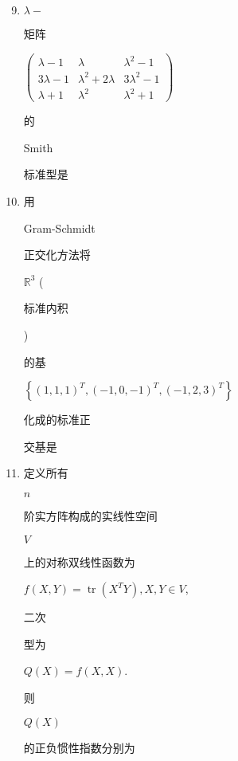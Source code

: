 \documentclass[10pt]{article}
\begin{document}
\begin{enumerate}
  \setcounter{enumi}{8}
  \item $\lambda-$ \begin{CJK}{UTF8}{mj}矩阵\end{CJK} $\left(\begin{array}{ccc}\lambda-1 & \lambda & \lambda^{2}-1 \\ 3 \lambda-1 & \lambda^{2}+2 \lambda & 3 \lambda^{2}-1 \\ \lambda+1 & \lambda^{2} & \lambda^{2}+1\end{array}\right)$ \begin{CJK}{UTF8}{mj}的\end{CJK} Smith \begin{CJK}{UTF8}{mj}标准型是\end{CJK}

  \item \begin{CJK}{UTF8}{mj}用\end{CJK} Gram-Schmidt \begin{CJK}{UTF8}{mj}正交化方法将\end{CJK} $\mathbb{R}^{3}$ (\begin{CJK}{UTF8}{mj}标准内积\end{CJK}) \begin{CJK}{UTF8}{mj}的基\end{CJK} $\left\{(1,1,1)^{T},(-1,0,-1)^{T},(-1,2,3)^{T}\right\}$ \begin{CJK}{UTF8}{mj}化成的标准正\end{CJK} \begin{CJK}{UTF8}{mj}交基是\end{CJK}

  \item \begin{CJK}{UTF8}{mj}定义所有\end{CJK} $n$ \begin{CJK}{UTF8}{mj}阶实方阵构成的实线性空间\end{CJK} $V$ \begin{CJK}{UTF8}{mj}上的对称双线性函数为\end{CJK} $f(X, Y)=\operatorname{tr}\left(X^{T} Y\right), X, Y \in V$, \begin{CJK}{UTF8}{mj}二次\end{CJK} \begin{CJK}{UTF8}{mj}型为\end{CJK} $Q(X)=f(X, X)$. \begin{CJK}{UTF8}{mj}则\end{CJK} $Q(X)$ \begin{CJK}{UTF8}{mj}的正负惯性指数分别为\end{CJK}

\end{enumerate}
\end{document}
